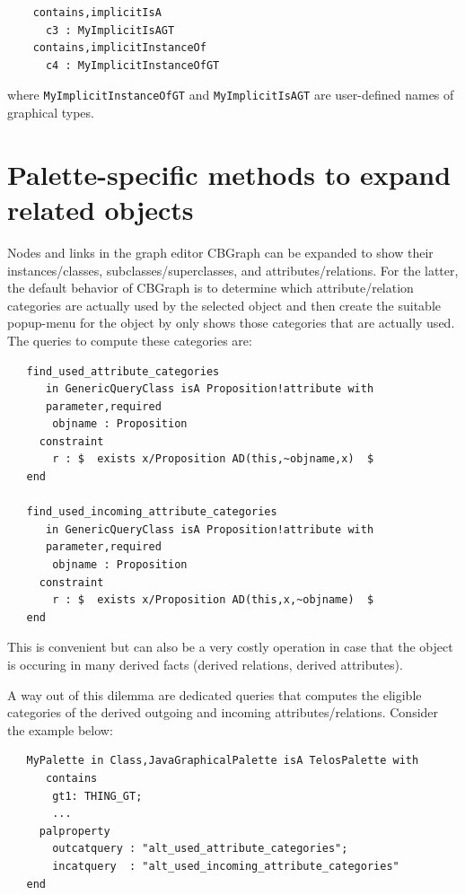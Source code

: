 {\small
\begin{verbatim}
    contains,implicitIsA
      c3 : MyImplicitIsAGT
    contains,implicitInstanceOf
      c4 : MyImplicitInstanceOfGT
\end{verbatim}
}

where {\tt MyImplicitInstanceOfGT} and {\tt MyImplicitIsAGT} are user-defined names of graphical types.



\section{Palette-specific methods to expand related objects}
\label{palette-expand}

Nodes and links in the graph editor CBGraph can be expanded to show their instances/classes, subclasses/superclasses, and attributes/relations.
For the latter, the default behavior of CBGraph is to determine which attribute/relation categories are actually used by
the selected object and then create the suitable popup-menu for the object by only shows those categories that are actually
used. The queries to compute these categories are:

{\small
\begin{verbatim}
   find_used_attribute_categories 
      in GenericQueryClass isA Proposition!attribute with 
      parameter,required
       objname : Proposition
     constraint
       r : $  exists x/Proposition AD(this,~objname,x)  $
   end 

   find_used_incoming_attribute_categories
      in GenericQueryClass isA Proposition!attribute with 
      parameter,required
       objname : Proposition
     constraint
       r : $  exists x/Proposition AD(this,x,~objname)  $ 
   end 
\end{verbatim}
}

This is convenient but can also be a very costly operation in case that
the object is occuring in many derived facts (derived relations, derived attributes).

A way out of this dilemma are dedicated queries that computes the eligible
categories of the derived outgoing and incoming attributes/relations. Consider the
example below:

{\small
\begin{verbatim}
   MyPalette in Class,JavaGraphicalPalette isA TelosPalette with 
      contains
       gt1: THING_GT;
       ...
     palproperty
       outcatquery : "alt_used_attribute_categories";
       incatquery  : "alt_used_incoming_attribute_categories"
   end
\end{verbatim}
}

